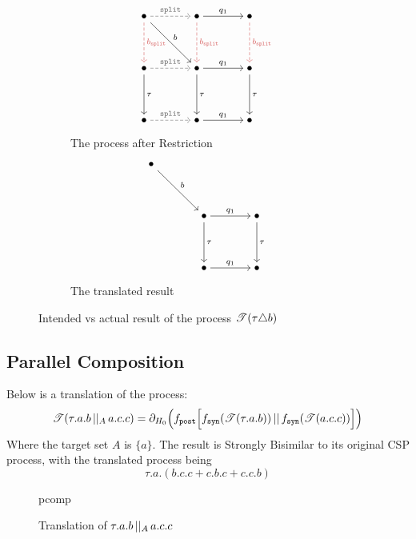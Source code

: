 \documentclass[../hons_project.tex]{subfiles}
\begin{document}
\begin{figure}[H]
	\centering
	\begin{subfigure}[b]{0.45\textwidth}
		\[\begin{tikzcd}[cramped, column sep=scriptsize]
				\bullet && \bullet && \bullet \\
				\\
				\bullet && \bullet && \bullet \\
				\\
				\bullet && \bullet && \bullet
				\arrow["{\mathtt{split}}", color={rgb,255:red,110;green,110;blue,110}, dashed, from=1-1, to=1-3]
				\arrow["{b_{\mathtt{split}}}", color={rgb,255:red,214;green,92;blue,92}, dashed, from=1-1, to=3-1]
				\arrow["b", from=1-1, to=3-3]
				\arrow["{q_1}", from=1-3, to=1-5]
				\arrow["{b_{\mathtt{split}}}", color={rgb,255:red,214;green,92;blue,92}, dashed, from=1-3, to=3-3]
				\arrow["{b_{\mathtt{split}}}", color={rgb,255:red,214;green,92;blue,92}, dashed, from=1-5, to=3-5]
				\arrow["{\mathtt{split}}", color={rgb,255:red,110;green,110;blue,110}, dashed, from=3-1, to=3-3]
				\arrow["\tau", from=3-1, to=5-1]
				\arrow["{q_1}", from=3-3, to=3-5]
				\arrow["\tau", from=3-3, to=5-3]
				\arrow["\tau", from=3-5, to=5-5]
				\arrow["{\mathtt{split}}", color={rgb,255:red,110;green,110;blue,110}, dashed, from=5-1, to=5-3]
				\arrow["{q_1}", from=5-3, to=5-5]
			\end{tikzcd}\]
		\caption{The process after Restriction}
	\end{subfigure}\hfill
	\begin{subfigure}[b]{0.45\textwidth}
		\[\begin{tikzcd}[cramped, column sep=scriptsize]
				\bullet \\
				\\
				&& \bullet && \bullet \\
				\\
				&& \bullet && \bullet
				\arrow["b", from=1-1, to=3-3]
				\arrow["{q_1}", from=3-3, to=3-5]
				\arrow["\tau", from=3-3, to=5-3]
				\arrow["\tau", from=3-5, to=5-5]
				\arrow["{q_1}", from=5-3, to=5-5]
			\end{tikzcd}\]
		\caption{The translated result}
	\end{subfigure}
	\caption{Intended vs actual result of the process $\mathscr{T}(\tau \triangle b)$}
\end{figure}

\newpage
\subsection{Parallel Composition}
Below is a translation of the process:
\[\mathscr{T}(\tau.a.b \,\vert\vert_{A}\, a.c.c)     = \partial_{H_{0}}\Bigl(f_{\mathtt{post}}\Bigl[f_{\mathtt{syn}}(\mathscr{T}(\tau.a.b)) \,\vert\vert\, f_{\mathtt{syn}}(\mathscr{T}(a.c.c))\Bigr]\Bigr)\]
Where the target set $A$ is $\{a\}$.
The result is Strongly Bisimilar to its original CSP process, with the translated process being
\[\tau.a.(b.c.c+c.b.c+c.c.b)\]
\begin{figure}[h!]
	\centering
	{pcomp}
	\caption{Translation of $\tau.a.b \,\vert\vert_{A}\, a.c.c$}
\end{figure}


\end{document}

